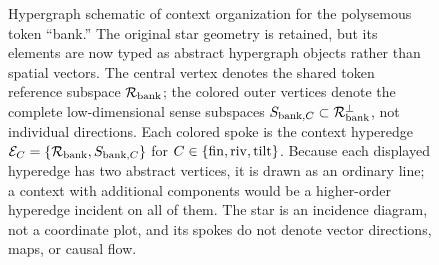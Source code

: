 \documentclass[
  aps,
  reprint,
  superscriptaddress,
  floatfix,
  nofootinbib,
  longbibliography
]{revtex4-2}
\begin{document}
\begin{figure}[t]
\centering
{}
\caption{%
Hypergraph schematic of context organization for the polysemous token
``bank.'' The original star geometry is retained, but its elements are now
typed as abstract hypergraph objects rather than spatial vectors. The central
vertex denotes the shared token reference subspace $\mathcal R_{\rm bank}$;
the colored outer vertices denote the complete low-dimensional sense
subspaces $S_{{\rm bank},C}\subset\mathcal R_{\rm bank}^{\perp}$, not
individual directions. Each colored spoke is the context hyperedge
$\mathcal E_C=\{\mathcal R_{\rm bank},S_{{\rm bank},C}\}$ for
$C\in\{{\rm fin},{\rm riv},{\rm tilt}\}$. Because each displayed hyperedge
has two abstract vertices, it is drawn as an ordinary line; a context with
additional components would be a higher-order hyperedge incident on all of
them. The star is an incidence diagram, not a coordinate plot, and its spokes
do not denote vector directions, maps, or causal flow.
}
\label{fig:reference-subspace}
\end{figure}
\end{document}
